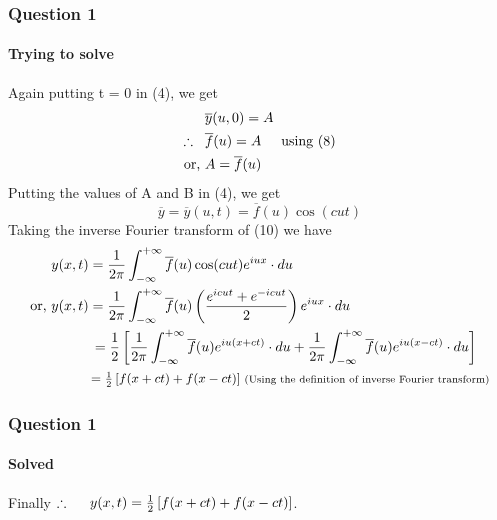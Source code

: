 \documentclass[9 pt]{beamer}
\begin{document}
\begin{frame}[fragile]
	\frametitle{Question 1}
	\framesubtitle{Trying to solve}
	Again putting t = 0 in (4), we get
	\begin{align*}
		                          & \overline{y}(u,0)=A                                 \\
		\therefore \hspace{0.3cm} & \overline{f}(u)=A \hspace{0.5cm} \textrm{using (8)} \\
		\textrm{or, }             & A=\overline{f}(u)
	\end{align*}
	Putting the values of A and B in (4), we get
	\begin{equation}
		\overline{y}=\overline{y}(u,t)=\overline{f}(u)\cos (cut)
	\end{equation}
	Taking the inverse Fourier transform of (10) we have
	\begin{align*}
		              & y(x,t)=\frac{1}{2\pi}\int_{-\infty}^{+\infty}\overline{f}(u)\cos (cut)e^{iux}\cdot du                                                                                                      \\
		\textrm{or, } & y(x,t)=\frac{1}{2\pi}\int_{-\infty}^{+\infty}\overline{f}(u)\left(\frac{e^{icut}+e^{-icut}}{2}\right) e^{iux}\cdot du                                                                      \\
		              & \hspace{1cm}=\frac{1}{2}\left[\frac{1}{2\pi}\int_{-\infty}^{+\infty}\overline{f}(u)e^{iu(x+ct)}\cdot du + \frac{1}{2\pi}\int_{-\infty}^{+\infty}\overline{f}(u)e^{iu(x-ct)}\cdot du\right] \\
		              & \hspace{1cm}\mbox{\small $=\frac{1}{2}\left[f(x+ct)+f(x-ct)\right]$}\hspace{0.1cm} \textrm{\scriptsize{(Using the definition of inverse Fourier transform)}}
	\end{align*}
	\transfade[duration=0.6]
\end{frame}


\begin{frame}[fragile]
	\frametitle{Question 1}
	\framesubtitle{Solved}
	\begin{block}{Finally}
		$\therefore\hspace{0.5cm}y(x,t)=\frac{1}{2}\left[f(x+ct)+f(x-ct)\right]$.
	\end{block}
	\transwipe[duration=0.6]
\end{frame}
\end{document}
